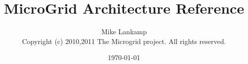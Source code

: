 \documentclass[twoside,openright,a4paper]{book}
\author{Mike Lankamp \\
Copyright (c) 2010,2011 The Microgrid project. All rights reserved.}
\title{MicroGrid Architecture Reference}
\date{\today}
\begin{document}
\maketitle
\tableofcontents















\renewcommand{\bibname}{References}


\end{document}
